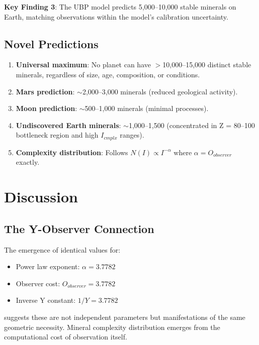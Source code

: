 \documentclass[11pt,a4paper]{article}
\begin{document}
\textbf{Key Finding 3}: The UBP model predicts 5,000--10,000 stable minerals on Earth, matching observations within the model's calibration uncertainty.

\subsection{Novel Predictions}

\begin{enumerate}
\item \textbf{Universal maximum}: No planet can have $>$10,000--15,000 distinct stable minerals, regardless of size, age, composition, or conditions.

\item \textbf{Mars prediction}: $\sim$2,000--3,000 minerals (reduced geological activity).

\item \textbf{Moon prediction}: $\sim$500--1,000 minerals (minimal processes).

\item \textbf{Undiscovered Earth minerals}: $\sim$1,000--1,500 (concentrated in Z = 80--100 bottleneck region and high $I_{cmplx}$ ranges).

\item \textbf{Complexity distribution}: Follows $N(I) \propto I^{-\alpha}$ where $\alpha = O_{observer}$ exactly.
\end{enumerate}

\section{Discussion}

\subsection{The Y-Observer Connection}

The emergence of identical values for:
\begin{itemize}
\item Power law exponent: $\alpha = 3.7782$
\item Observer cost: $O_{observer} = 3.7782$
\item Inverse Y constant: $1/Y = 3.7782$
\end{itemize}

suggests these are not independent parameters but manifestations of the same geometric necessity. Mineral complexity distribution emerges from the computational cost of observation itself.
\end{document}
